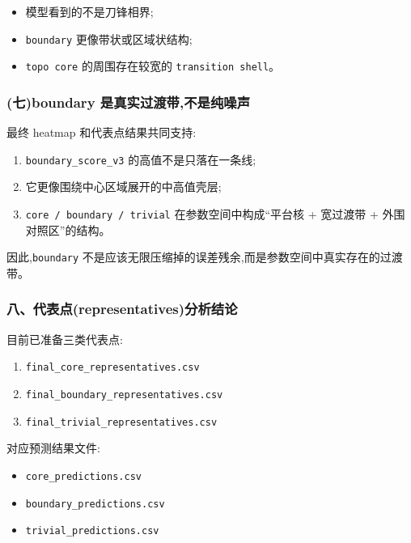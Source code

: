 \documentclass[lang=cn,scheme=chinese,color=blue,device=normal,toc=onecol,math=cm]{elegantbook}
\begin{document}
\begin{itemize}
\item 模型看到的不是刀锋相界;
\item \texttt{boundary} 更像带状或区域状结构;
\item \texttt{topo core} 的周围存在较宽的 \texttt{transition shell}。
\end{itemize}


\subsubsection{(七)boundary 是真实过渡带,不是纯噪声}


最终 heatmap 和代表点结果共同支持:\par


\begin{enumerate}
\item \texttt{boundary\_\allowbreak{}score\_\allowbreak{}v3} 的高值不是只落在一条线;
\item 它更像围绕中心区域展开的中高值壳层;
\item \texttt{core /\allowbreak{} boundary /\allowbreak{} trivial} 在参数空间中构成“平台核 + 宽过渡带 + 外围对照区”的结构。
\end{enumerate}


因此,\texttt{boundary} 不是应该无限压缩掉的误差残余,而是参数空间中真实存在的过渡带。\par


\subsubsection{八、代表点(representatives)分析结论}


目前已准备三类代表点:\par


\begin{enumerate}
\item \texttt{final\_\allowbreak{}core\_\allowbreak{}representatives.csv}
\item \texttt{final\_\allowbreak{}boundary\_\allowbreak{}representatives.csv}
\item \texttt{final\_\allowbreak{}trivial\_\allowbreak{}representatives.csv}
\end{enumerate}


对应预测结果文件:\par


\begin{itemize}
\item \texttt{core\_\allowbreak{}predictions.csv}
\item \texttt{boundary\_\allowbreak{}predictions.csv}
\item \texttt{trivial\_\allowbreak{}predictions.csv}
\end{itemize}
\end{document}
